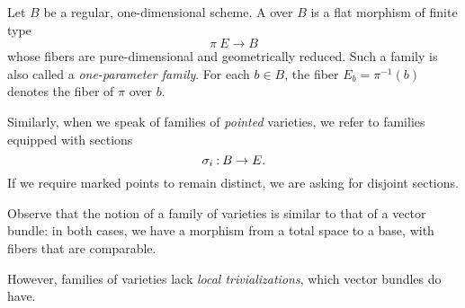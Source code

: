 \documentclass[12pt]{memoir}
\begin{document}
\begin{Def}[J. Kóllar]
Let $B$ be a regular, one-dimensional scheme. A  over $B$ is a flat morphism of finite type
$$\pi\: E\to B$$
whose fibers are pure-dimensional and geometrically reduced. Such a family is also called a \emph{one-parameter family}. For each $b \in B$, the fiber $E_b = \pi^{-1}(b)$ denotes the fiber of $\pi$ over $b$.
\end{Def}

Similarly, when we speak of families of \emph{pointed} varieties, we refer to families equipped with sections
$$\sigma_i\mathbin{:} B\to E.$$
If we require marked points to remain distinct, we are asking for disjoint sections.

\begin{Rmk} 
    Observe that the notion of a family of varieties is similar to that of a vector bundle: in both cases, we have a morphism from a total space to a base, with fibers that are comparable.\par
    However, families of varieties lack \emph{local trivializations}, which vector bundles do have. 
\end{Rmk}
\end{document}
